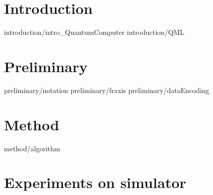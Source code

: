 \documentclass[senior,final,11pt,dvipdfmx]{iscs-thesis}
\date{January 27, 2023}
\begin{document}



\maketitle




\frontmatter %
\tableofcontents %
\mainmatter %


\chapter{Introduction \label{chap:introduction}}

 {introduction/intro_QuantumComputer}
 {introduction/QML}






\chapter{Preliminary \label{chap:preliminary}}

 {preliminary/notation}
 {preliminary/fraxis}
 {preliminary/dataEncoding}


\chapter{Method \label{chap:method}}



 {method/algorithm}


\chapter{Experiments on simulator \label{chap:experiments}}




\end{document}
